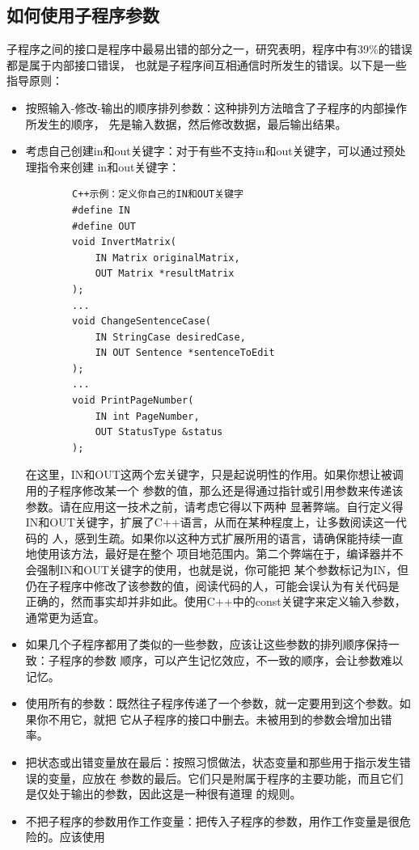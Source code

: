 \documentclass{article}
\begin{document}
\subsection{如何使用子程序参数}
子程序之间的接口是程序中最易出错的部分之一，研究表明，程序中有39\%的错误都是属于内部接口错误，
也就是子程序间互相通信时所发生的错误。以下是一些指导原则：
\begin{itemize}
    \item 按照输入-修改-输出的顺序排列参数：这种排列方法暗含了子程序的内部操作所发生的顺序，
    先是输入数据，然后修改数据，最后输出结果。
    \item 考虑自己创建in和out关键字：对于有些不支持in和out关键字，可以通过预处理指令来创建
    in和out关键字：
    \begin{lstlisting}
        C++示例：定义你自己的IN和OUT关键字
        #define IN
        #define OUT
        void InvertMatrix(
            IN Matrix originalMatrix,
            OUT Matrix *resultMatrix
        );
        ...
        void ChangeSentenceCase(
            IN StringCase desiredCase,
            IN OUT Sentence *sentenceToEdit
        );
        ...
        void PrintPageNumber(
            IN int PageNumber,
            OUT StatusType &status
        );
    \end{lstlisting}
    在这里，IN和OUT这两个宏关键字，只是起说明性的作用。如果你想让被调用的子程序修改某一个
    参数的值，那么还是得通过指针或引用参数来传递该参数。请在应用这一技术之前，请考虑它得以下两种
    显著弊端。自行定义得IN和OUT关键字，扩展了C++语言，从而在某种程度上，让多数阅读这一代码的
    人，感到生疏。如果你以这种方式扩展所用的语言，请确保能持续一直地使用该方法，最好是在整个
    项目地范围内。第二个弊端在于，编译器并不会强制IN和OUT关键字的使用，也就是说，你可能把
    某个参数标记为IN，但仍在子程序中修改了该参数的值，阅读代码的人，可能会误认为有关代码是
    正确的，然而事实却并非如此。使用C++中的const关键字来定义输入参数，通常更为适宜。
    \item 如果几个子程序都用了类似的一些参数，应该让这些参数的排列顺序保持一致：子程序的参数
    顺序，可以产生记忆效应，不一致的顺序，会让参数难以记忆。
    \item 使用所有的参数：既然往子程序传递了一个参数，就一定要用到这个参数。如果你不用它，就把
    它从子程序的接口中删去。未被用到的参数会增加出错率。
    \item 把状态或出错变量放在最后：按照习惯做法，状态变量和那些用于指示发生错误的变量，应放在
    参数的最后。它们只是附属于程序的主要功能，而且它们是仅处于输出的参数，因此这是一种很有道理
    的规则。
    \item 不把子程序的参数用作工作变量：把传入子程序的参数，用作工作变量是很危险的。应该使用

\end{itemize}
\end{document}
